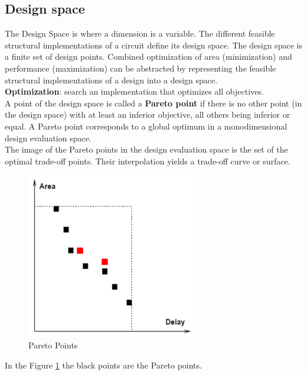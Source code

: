\subsection{Design space}
The Design Space is where a dimension is a variable. The different feasible structural implementations of a circuit define its design space. The design space is a finite set of design points. Combined optimization of area (minimization) and performance (maximization) can be abstracted by representing the feasible structural implementations of a design into a design space.
\bigskip \\
\textbf{Optimization}: search an implementation that optimizes all
objectives.
\bigskip \\
A  point of the design space is called a  \textbf{Pareto point} if there is no other point (in the design space) with at least an inferior objective, all others being inferior or equal. A Pareto point corresponds to a global optimum in a monodimensional design evaluation space.\\ 
The image of the Pareto points in the design evaluation space is the set of the optimal  trade-off  points. Their interpolation yields a  trade-off curve  or  surface.
\begin{figure}[H]
	\centering
	\includegraphics[height=50 mm]{./Cap1/Images/Image04.png}
	\caption[Optional caption]{Pareto Points}
	\label{fig:Pareto}
\end{figure}
\begin{flushleft}
	In the Figure \ref{fig:Pareto} the black points are the Pareto points.
\end{flushleft}

